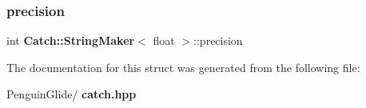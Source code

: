 \subsubsection{precision}
{\footnotesize\ttfamily int \textbf{ Catch\+::\+String\+Maker}$<$ float $>$\+::precision\hspace{0.3cm}{\ttfamily [static]}}



The documentation for this struct was generated from the following file\+:\begin{DoxyCompactItemize}
\item 
Penguin\+Glide/\textbf{ catch.\+hpp}\end{DoxyCompactItemize}
